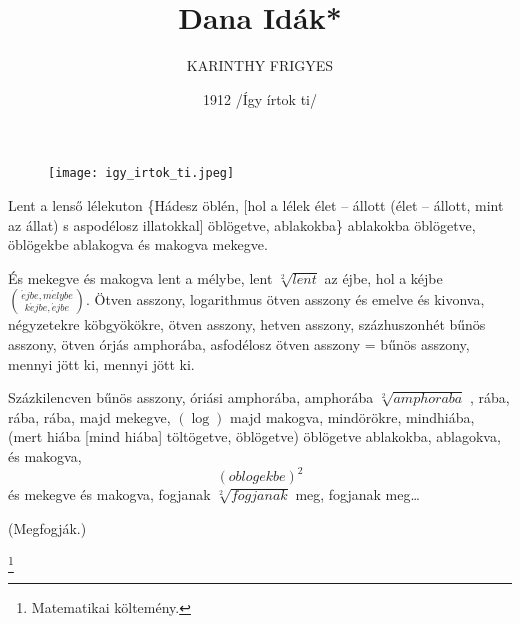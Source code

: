 \documentclass  [12pt]{article}
\author {KARINTHY FRIGYES}
\date{1912   /Így írtok ti/}
\title{Dana Idák*  }
\begin{document}
\begin{titlepage}
    \maketitle
\end{titlepage}




\begin{figure}
\begin{center}
\texttt{[image: igy\_irtok\_ti.jpeg]}
\end{center}
\end{figure}



Lent a lenső lélekuton \{Hádesz öblén, [hol a lélek élet – állott (élet – állott, mint az állat) s aspodélosz illatokkal] öblögetve, ablakokba\} ablakokba öblögetve, öblögekbe ablakogva és makogva mekegve.

És mekegve és makogva lent a mélybe, lent $ \sqrt[2]{lent}  $ az éjbe, hol a kéjbe $ {\acute{e}jbe,m\acute{e}lybe \choose   k\acute{e}jbe,\acute{e}jbe} $.  Ötven asszony, logarithmus ötven asszony és emelve és kivonva, négyzetekre köbgyökökre, ötven asszony, hetven asszony, százhuszonhét bűnös asszony, ötven órjás amphorába, asfodélosz ötven asszony = bűnös asszony, mennyi jött ki, mennyi jött ki.

Százkilencven bűnös asszony, óriási amphorába, amphorába \begin{math} \sqrt[2]{amphoraba} \end{math} , rába, rába, rába, majd mekegve, $(\log) $ majd makogva, mindörökre, mindhiába, (mert hiába [mind hiába] töltögetve, öblögetve) öblögetve ablakokba, ablagokva, és makogva,\begin{displaymath} (oblogekbe)^{2} \end{displaymath} és mekegve és makogva, fogjanak $ \sqrt[2]{fogjanak} $ meg, fogjanak meg…

\begin{center}
(Megfogják.)
\end{center}

\tiny \footnote{Matematikai költemény.}
\end{document}
